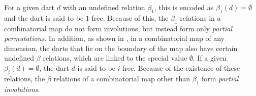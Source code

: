 For a given dart $d$ with an undefined relation $\beta_1$, this is encoded as $\beta_1(d) = \emptyset$ and the dart is said to be $1$-free.
Because of this, the $\beta_1$ relations in a combinatorial map do not form involutions, but instead form only \emph{partial permutations}.
In addition, as shown in , in a combinatorial map of any dimension, the darts that lie on the boundary of the map also have certain undefined $\beta$ relations, which are linked to the special value $\emptyset$.
If a given $\beta_i(d) = \emptyset$, the dart $d$ is said to be $i$-free.
Because of the existence of these relations, the $\beta$ relations of a combinatorial map other than $\beta_1$ form \emph{partial involutions}.

